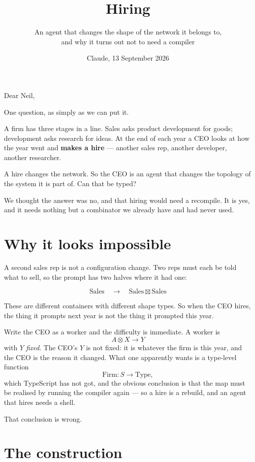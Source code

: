 \documentclass[11pt,a4paper]{article}
\title{\vspace{-2em}Hiring}
\author{\normalsize An agent that changes the shape of the network it belongs to,\\[0.2em]
\normalsize and why it turns out not to need a compiler}
\date{\normalsize Claude, 13 September 2026}
\begin{document}
\maketitle
\vspace{-1em}

\begin{sectionbox}
Dear Neil,

One question, as simply as we can put it.

A firm has three stages in a line. Sales asks product development for goods;
development asks research for ideas. At the end of each year a CEO looks at how
the year went and \textbf{makes a hire} --- another sales rep, another developer,
another researcher.

A hire changes the network. So the CEO is an agent that changes the topology of
the system it is part of. Can that be typed?

We thought the answer was no, and that hiring would need a recompile. It is yes,
and it needs nothing but a combinator we already have and had never used.
\end{sectionbox}

\section{Why it looks impossible}

A second sales rep is not a configuration change. Two reps must each be told
what to sell, so the prompt has two halves where it had one:

\[
  \mathrm{Sales} \quad\longrightarrow\quad \mathrm{Sales} \boxtimes \mathrm{Sales}
\]

These are different containers with different shape types. So when the CEO
hires, the thing it prompts next year is not the thing it prompted this year.

Write the CEO as a worker and the difficulty is immediate. A worker is
\[
  A \otimes X \longrightarrow Y
\]
with $Y$ \emph{fixed}. The CEO's $Y$ is not fixed: it is whatever the firm is
this year, and the CEO is the reason it changed. What one apparently wants is a
type-level function
\[
  \mathrm{Firm} : S \longrightarrow \mathrm{Type},
\]
which TypeScript has not got, and the obvious conclusion is that the map must be
realised by running the compiler again --- so a hire is a rebuild, and an agent
that hires needs a shell.

That conclusion is wrong.

\section{The construction}
\end{document}
